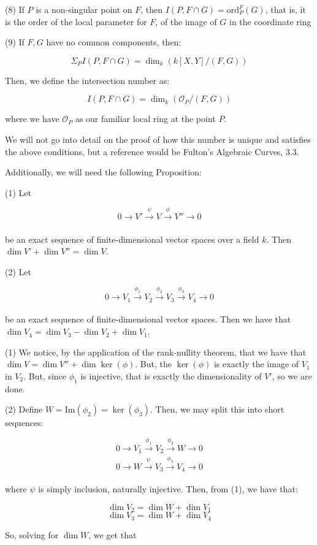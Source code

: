 \documentclass[10pt]{article}
\begin{document}
(8) If $P$ is a non-singular point on $F$, then $I(P, F \cap G) = \text{ord}_P^F(G)$, that is, it is the order of the local parameter for $F$, of the image of $G$ in the coordinate ring

(9) If $F,G$ have no common components, then:

$$ \Sigma_P  I(P,F \cap G) = \dim_k(k[X,Y]/(F,G)) $$

Then, we define the intersection number as:

$$ I(P,F \cap G) = \dim_k(\mathcal{O}_P/(F,G)) $$

where we have $\mathcal{O}_P$ as our familiar local ring at the point $P$.

We will not go into detail on the proof of how this number is unique and satisfies the above conditions, but a reference would be Fulton’s Algebraic Curves, 3.3.

Additionally, we will need the following Proposition:

(1) Let 

$$ 0 \to V' \xrightarrow[]{\psi} V  \xrightarrow[]{\phi} V'' \to 0 $$

be an exact sequence of finite-dimensional vector spaces over a field $k$. Then $\dim V’ + \dim V''= \dim V$.

(2) Let

$$ 0 \to V_1 \xrightarrow[]{\phi_1} V_2 \xrightarrow[]{\phi_2} V_3 \xrightarrow[]{\phi_3} V_4 \to 0 $$

be an exact sequence of finite-dimensional vector spaces. Then we have that $\dim V_4 = \dim V_3 - \dim V_2 + \dim V_1$.

(1) We notice, by the application of the rank-nullity theorem, that we have that $\dim V = \dim V'' + \dim \ker(\phi)$. But, the $\ker(\phi)$ is exactly the image of $V_1$ in $V_2$. But, since $\phi_1$ is injective, that is exactly the dimensionality of $V'$, so we are done.

(2) Define $W = \text{Im}(\phi_2) = \ker(\phi_3)$. Then, we may split this into short sequences:

$$ 0 \to  V_1 \xrightarrow[]{\phi_1} V_2 \xrightarrow[]{\phi_2} W \to 0 $$
$$ 0 \to W \xrightarrow[]{\psi} V_3  \xrightarrow[]{\phi_3} V_4 \to 0 $$

where $\psi$ is simply inclusion, naturally injective. Then, from (1), we have that:

$$\dim V_2 = \dim W + \dim V_1$$
$$ \dim V_3 = \dim W + \dim V_4$$

So, solving for $\dim W$, we get that
\end{document}
